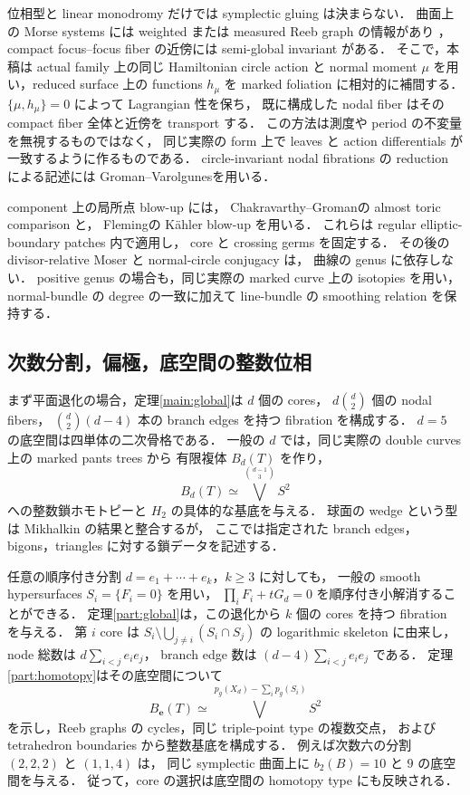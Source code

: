 位相型と linear monodromy だけでは symplectic gluing は決まらない．
曲面上の Morse systems には weighted または measured Reeb graph の情報があり
\cite{DMT,IKM}，compact focus--focus fiber の近傍には
semi-global invariant がある\cite[Theorem 2.1]{VuNgoc}．
そこで，本稿は actual family 上の同じ Hamiltonian circle action と
normal moment $\mu$ を用い，reduced surface 上の functions $h_\mu$ を
marked foliation に相対的に補間する．
$\{\mu,h_\mu\}=0$ によって Lagrangian 性を保ち，
既に構成した nodal fiber はその compact fiber 全体と近傍を transport する．
この方法は測度や period の不変量を無視するものではなく，
同じ実際の form 上で leaves と action differentials が一致するように作るものである．
circle-invariant nodal fibrations の reduction による記述には
Groman--Varolgunes\cite[\S7.3]{GV}を用いる．

component 上の局所点 blow-up には，
Chakravarthy--Groman\cite[Theorem 1.1]{CGblowup}の almost toric comparison と，
Fleming\cite[Proposition 4.6, Construction 4.7]{Fleming}の Kähler blow-up を用いる．
これらは regular elliptic-boundary patches 内で適用し，
core と crossing germs を固定する．
その後の divisor-relative Moser と normal-circle conjugacy は，
曲線の genus に依存しない．
positive genus の場合も，同じ実際の marked curve 上の isotopies を用い，
normal-bundle の degree の一致に加えて line-bundle の smoothing relation を保持する．

\subsection{次数分割，偏極，底空間の整数位相}

まず平面退化の場合，定理\ref{main:global}は $d$ 個の cores，
$d\binom d2$ 個の nodal fibers，
$\binom d2(d-4)$ 本の branch edges を持つ fibration を構成する．
$d=5$ の底空間は四単体の二次骨格である．
一般の $d$ では，同じ実際の double curves 上の marked pants trees から
有限複体 $B_d(T)$ を作り，
\[
 B_d(T)\simeq\bigvee^{\binom{d-1}{3}}S^2
\]
への整数鎖ホモトピーと $H_2$ の具体的な基底を与える．
球面の wedge という型は Mikhalkin の結果と整合するが，
ここでは指定された branch edges，bigons，triangles に対する鎖データを記述する．

任意の順序付き分割 $d=e_1+\cdots+e_k$，$k\geq3$ に対しても，
一般の smooth hypersurfaces $S_i=\{F_i=0\}$ を用い，
$\prod_iF_i+tG_d=0$ を順序付き小解消することができる．
定理\ref{part:global}は，この退化から $k$ 個の cores を持つ fibration を与える．
第 $i$ core は
$S_i\setminus\bigcup_{j\ne i}(S_i\cap S_j)$ の logarithmic skeleton に由来し，
node 総数は $d\sum_{i<j}e_i e_j$，
branch edge 数は $(d-4)\sum_{i<j}e_i e_j$ である．
定理\ref{part:homotopy}はその底空間について
\[
 B_{\mathbf e}(T)\simeq
 \bigvee^{\,p_g(X_d)-\sum_i p_g(S_i)}S^2
\]
を示し，Reeb graphs の cycles，同じ triple-point type の複数交点，
および tetrahedron boundaries から整数基底を構成する．
例えば次数六の分割 $(2,2,2)$ と $(1,1,4)$ は，
同じ symplectic 曲面上に $b_2(B)=10$ と $9$ の底空間を与える．
従って，core の選択は底空間の homotopy type にも反映される．

